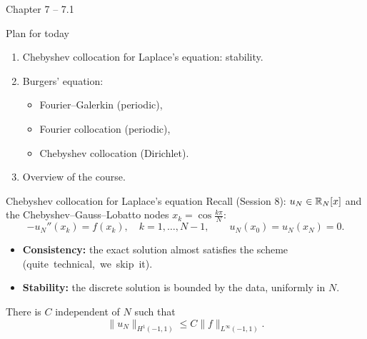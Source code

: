 
{Chapter 7}
{--}
{7.1}

\begin{frame}{Plan for today}
    \begin{enumerate}
        \item Chebyshev collocation for Laplace's equation: stability.
        \item Burgers' equation:
              \begin{itemize}
                  \item Fourier--Galerkin (periodic),
                  \item Fourier collocation (periodic),
                  \item Chebyshev collocation (Dirichlet).
              \end{itemize}
        \item Overview of the course.
    \end{enumerate}
    \bigskip
\end{frame}

\begin{frame}{Chebyshev collocation for Laplace's equation}
    Recall (Session 8): $u_N \in {\mathbb R}_N[x]$ and the Chebyshev--Gauss--Lobatto nodes $x_k = \cos\frac{k\pi}{N}$:
    \[
        -u_N''(x_k) = f(x_k), \quad k = 1, \dots, N-1, \qquad u_N(x_0) = u_N(x_N) = 0.
    \]
    \begin{itemize}
        \item \textbf{Consistency:} the exact solution almost satisfies the scheme \mbox{(quite technical, we skip it).}
        \item \textbf{Stability:} the discrete solution is bounded by the data, uniformly in $N$.
    \end{itemize}
    \begin{theorem}[Stability]
        There is $C$ independent of $N$ such that
        \[
            \|u_N\|_{H^1(-1,1)} \le C \|f\|_{L^\infty(-1,1)} .
        \]
    \end{theorem}
\end{frame}

